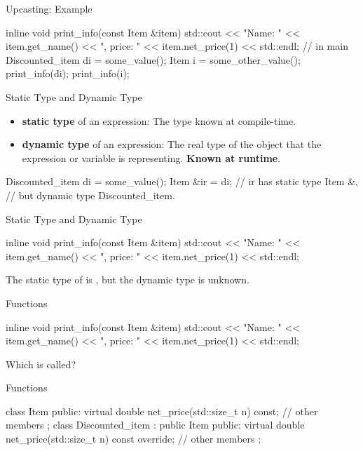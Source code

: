 \documentclass{beamer}
\begin{document}
\begin{frame}[fragile]{Upcasting: Example}
    \begin{cpp}
inline void print_info(const Item &item) {
  std::cout << "Name: " << item.get_name()
            << ", price: " << item.net_price(1)
            << std::endl;
}
// in main
Discounted_item di = some_value();
Item i = some_other_value();
print_info(di);
print_info(i);
    \end{cpp}
\end{frame}

\begin{frame}[fragile]{Static Type and Dynamic Type}
    \begin{itemize}
        \item \textbf{static type} of an expression: The type known at compile-time.
        \item \textbf{dynamic type} of an expression: The real type of the object that the expression or variable is representing. \textbf{Known at runtime}.
    \end{itemize}
    \begin{cpp}
Discounted_item di = some_value();
Item &ir = di; // ir has static type Item &,
               // but dynamic type Discounted_item.
    \end{cpp}
\end{frame}

\begin{frame}[fragile]{Static Type and Dynamic Type}
    \begin{cpp}
inline void print_info(const Item &item) {
  std::cout << "Name: " << item.get_name()
            << ", price: " << item.net_price(1)
            << std::endl;
}
    \end{cpp}
    The static type of  is \const{}, but the dynamic type is unknown.
\end{frame}

\begin{frame}[fragile]{\virtual Functions}
    \begin{cpp}
inline void print_info(const Item &item) {
  std::cout << "Name: " << item.get_name()
            << ", price: " << item.net_price(1)
            << std::endl;
}
    \end{cpp}
    Which  is called?
\end{frame}

\begin{frame}[fragile]{\virtual Functions}
    \begin{cpp}
class Item {
 public:
  virtual double net_price(std::size_t n) const;
  // other members
};
class Discounted_item : public Item {
 public:
  virtual double net_price(std::size_t n) const override;
  // other members
};
    \end{cpp}
\end{frame}
\end{document}
